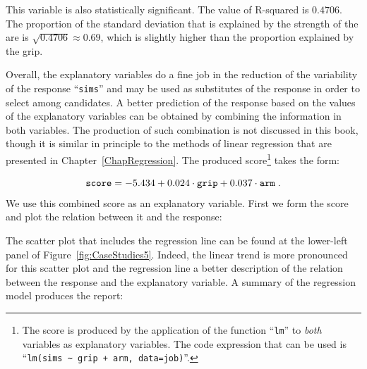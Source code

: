 \documentclass[
]{krantz}
\makeatletter
\newenvironment{Shaded}{\begin{snugshade}}{\end{snugshade}}
\newcommand{\DataTypeTok}[1]{\textcolor[rgb]{0.13,0.29,0.53}{#1}}
\newcommand{\FloatTok}[1]{\textcolor[rgb]{0.00,0.00,0.81}{#1}}
\newcommand{\KeywordTok}[1]{\textcolor[rgb]{0.13,0.29,0.53}{\textbf{#1}}}
\newcommand{\NormalTok}[1]{#1}
\newcommand{\OperatorTok}[1]{\textcolor[rgb]{0.81,0.36,0.00}{\textbf{#1}}}
\newcommand{\StringTok}[1]{\textcolor[rgb]{0.31,0.60,0.02}{#1}}
\newenvironment{kframe}{%
\medskip{}
\setlength{\fboxsep}{.8em}
 \def\at@end@of@kframe{}%
 \ifinner\ifhmode%
  \def\at@end@of@kframe{\end{minipage}}%
  \begin{minipage}{\columnwidth}%
 \fi\fi%
 \def\FrameCommand##1{\hskip\@totalleftmargin \hskip-\fboxsep
 \colorbox{shadecolor}{##1}\hskip-\fboxsep
     \hskip-\linewidth \hskip-\@totalleftmargin \hskip\columnwidth}%
 \MakeFramed {\advance\hsize-\width
   \@totalleftmargin\z@ \linewidth\hsize
   \@setminipage}}%
 {\par\unskip\endMakeFramed%
 \at@end@of@kframe}
\renewenvironment{Shaded}{\begin{kframe}}{\end{kframe}}
\theoremstyle{definition}
\theoremstyle{definition}
\theoremstyle{definition}
\theoremstyle{remark}
\makeatother
\begin{document}
This variable is also statistically significant. The value of R-squared
is \(0.4706\). The proportion of the standard deviation that is explained
by the strength of the are is \(\sqrt{0.4706} \approx 0.69\), which is
slightly higher than the proportion explained by the grip.

Overall, the explanatory variables do a fine job in the reduction of the
variability of the response ``\texttt{sims}'' and may be used as substitutes of
the response in order to select among candidates. A better prediction of
the response based on the values of the explanatory variables can be
obtained by combining the information in both variables. The production
of such combination is not discussed in this book, though it is similar
in principle to the methods of linear regression that are presented in
Chapter~\ref{ChapRegression}. The produced score\footnote{The score is produced by the application of the function ``\texttt{lm}'' to
  \emph{both} variables as explanatory variables. The code expression that
  can be used is ``\texttt{lm(sims\ \textasciitilde{}\ grip\ +\ arm,\ data=job)}''.} takes the form:

\[\mbox{\texttt{score}} = -5.434 + 0.024\cdot \mbox{\texttt{grip}}+ 0.037\cdot \mbox{\texttt{arm}}\;.\]
We use this combined score as an explanatory variable. First we form the
score and plot the relation between it and the response:

\begin{Shaded}
\end{Shaded}

The scatter plot that includes the regression line can be found at the
lower-left panel of Figure~\ref{fig:CaseStudies5}. Indeed, the linear
trend is more pronounced for this scatter plot and the regression line a
better description of the relation between the response and the
explanatory variable. A summary of the regression model produces the
report:
\end{document}
